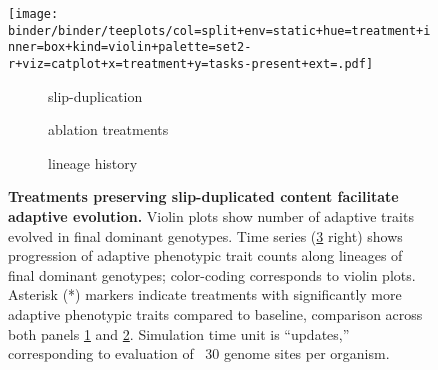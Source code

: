 \begin{figure}[!h]
  \centering
  \begin{adjustbox}{scale=0.8}
    \texttt{[image: binder/binder/teeplots/col=split+env=static+hue=treatment+inner=box+kind=violin+palette=set2-r+viz=catplot+x=treatment+y=tasks-present+ext=.pdf]}%
    \hspace*{-2.0cm}%
    \raisebox{0.125in}{%
      \texttt{[image: binder/binder/teeplots/env=static+errorbar=ci+hue=treatment+kind=line+palette=set2-r+viz=relplot+x=time-100k+y=tasks-present+ext=.pdf]}}%
  \end{adjustbox}

  \vspace{-7ex}

  \begin{subfigure}{0.3\textwidth}
    \caption{\small slip-duplication}
    \label{fig:results_panels:slip_duplication}
  \end{subfigure}%
  \begin{subfigure}{0.35\textwidth}
    \caption{\small ablation treatments}
    \label{fig:results_panels:ablation}
  \end{subfigure}%
  \begin{subfigure}{0.22\textwidth}
    \caption{\small lineage history}
    \label{fig:results_panels:time_series}
  \end{subfigure}

  \vspace{1ex}

  \caption{\textbf{Treatments preserving slip-duplicated content facilitate adaptive evolution.}
    \small Violin plots show number of adaptive traits evolved in final dominant genotypes.
    Time series (\ref{fig:results_panels:time_series} right) shows progression of adaptive phenotypic trait counts along lineages of final dominant genotypes; color-coding corresponds to violin plots.
    Asterisk (*) markers indicate treatments with significantly more adaptive phenotypic traits compared to baseline, comparison across both panels \ref{fig:results_panels:slip_duplication} and \ref{fig:results_panels:ablation}.
    Simulation time unit is “updates,” corresponding to evaluation of ~30 genome sites per organism.}
  \label{fig:results_panels}
\end{figure}
